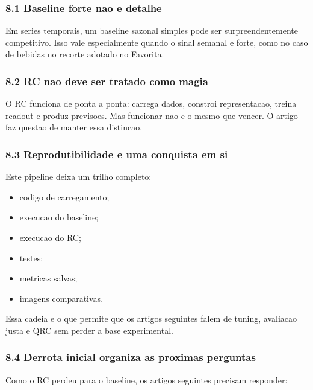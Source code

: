 \documentclass[12pt]{article}
\providecommand{\tightlist}{%
          \setlength{\itemsep}{0pt}\setlength{\parskip}{0pt}}
\begin{document}
\subsubsection{8.1 Baseline forte nao e detalhe}\label{81-baseline-forte-nao-e-detalhe}

Em series temporais, um baseline sazonal simples pode ser surpreendentemente competitivo. Isso vale especialmente quando o sinal semanal e forte, como no caso de bebidas no recorte adotado no Favorita.

\subsubsection{8.2 RC nao deve ser tratado como magia}\label{82-rc-nao-deve-ser-tratado-como-magia}

O RC funciona de ponta a ponta: carrega dados, constroi representacao, treina readout e produz previsoes. Mas funcionar nao e o mesmo que vencer. O artigo faz questao de manter essa distincao.

\subsubsection{8.3 Reprodutibilidade e uma conquista em si}\label{83-reprodutibilidade-e-uma-conquista-em-si}

Este pipeline deixa um trilho completo:

\begin{itemize}
\tightlist
\item
  codigo de carregamento;
\item
  execucao do baseline;
\item
  execucao do RC;
\item
  testes;
\item
  metricas salvas;
\item
  imagens comparativas.
\end{itemize}

Essa cadeia e o que permite que os artigos seguintes falem de tuning, avaliacao justa e QRC sem perder a base experimental.

\subsubsection{8.4 Derrota inicial organiza as proximas perguntas}\label{84-derrota-inicial-organiza-as-proximas-perguntas}

Como o RC perdeu para o baseline, os artigos seguintes precisam responder:
\end{document}
